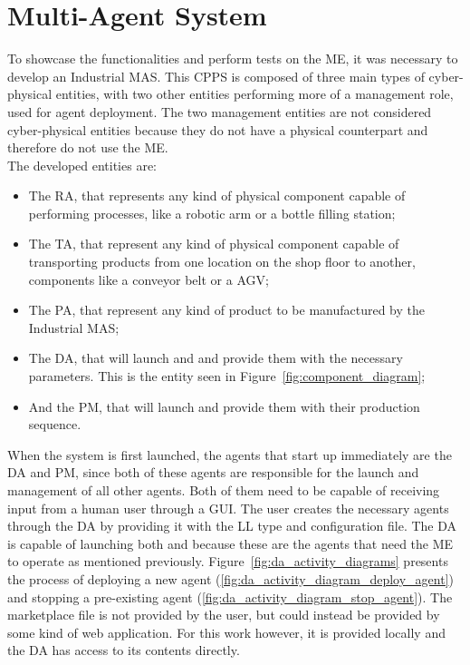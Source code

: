 \section{Multi-Agent System}
\label{sec:multi-agent_system}

To showcase the functionalities and perform tests on the \acrlong{ME}, it was necessary to develop an Industrial \acrfull{MAS}. This \acrlong{CPPS} is composed of three main types of cyber-physical entities, with two other entities performing more of a management role, used for agent deployment. The two management entities are not considered cyber-physical entities because they do not have a physical counterpart and therefore do not use the \acrshort{ME}.\\

The developed entities are:
\begin{itemize}
	\item The \acrfull{RA}, that represents any kind of physical component capable of performing processes, like a robotic arm or a bottle filling station;
	\item The \acrfull{TA}, that represent any kind of physical component capable of transporting products from one location on the shop floor to another, components like a conveyor belt or a \acrfull{AGV};
	\item The \acrfull{PA}, that represent any kind of product to be manufactured by the Industrial \acrshort{MAS};
	\item The \acrfull{DA}, that will launch  and  and provide them with the necessary parameters. This is the entity seen in Figure~\ref{fig:component_diagram};
	\item And the \acrfull{PM}, that will launch  and provide them with their production sequence.
\end{itemize}


When the system is first launched, the agents that start up immediately are the \acrfull{DA} and \acrfull{PM}, since both of these agents are responsible for the launch and management of all other agents. Both of them need to be capable of receiving input from a human user through a \acrfull{GUI}. The user creates the necessary agents through the \acrshort{DA} by providing it with the \acrshort{LL} type and configuration file. The \acrshort{DA} is capable of launching both  and  because these are the agents that need the \acrlong{ME} to operate as mentioned previously. Figure~\ref{fig:da_activity_diagrams} presents the process of deploying a new agent (\ref{fig:da_activity_diagram_deploy_agent}) and stopping a pre-existing agent (\ref{fig:da_activity_diagram_stop_agent}). The marketplace file is not provided by the user, but could instead be provided by some kind of web application. For this work however, it is provided locally and the \acrshort{DA} has access to its contents directly.\\

